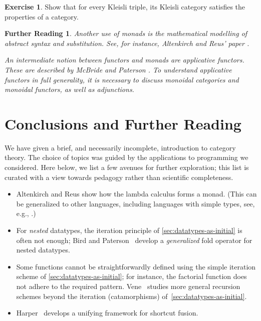 \documentclass[a4paper,11pt, oneside,titlepage=false]{scrbook}
\theoremstyle{plain}
\newtheorem*{reading*}{Further Reading}
\theoremstyle{definition}
\newtheorem{exer}[thm]{Exercise}
\begin{document}
\begin{exer} Show that for every Kleisli triple, its Kleisli category satisfies the properties of a category.
\end{exer}

\begin{reading*}
  Another use of monads is the mathematical modelling of abstract syntax and \emph{substitution}.
  See, for instance, Altenkirch and Reus' paper \cite{DBLP:conf/csl/AltenkirchR99}.

  An intermediate notion between functors and monads are \emph{applicative functors}. These are described by McBride and Paterson \cite{DBLP:journals/jfp/McbrideP08}.
  To understand applicative functors in full generality, it is necessary to discuss monoidal categories and monoidal functors, as well as adjunctions.
\end{reading*}

\chapter{Conclusions and Further Reading}

We have given a brief, and necessarily incomplete, introduction to category theory.
The choice of topics was guided by the applications to programming we considered.
 Here below, we list a few avenues for further exploration; this list is curated with a view towards pedagogy rather than scientific completeness.
\begin{itemize}
\item Altenkirch and Reus show how the lambda calculus forms a monad.
  (This can be generalized to other languages, including languages with simple types, see, e.g., \cite{DBLP:journals/jfrea/AhrensZ11}.)
\item For \emph{nested} datatypes, the iteration principle of \cref{sec:datatypes-as-initial} is often not enough; Bird and Paterson~\cite{DBLP:journals/fac/BirdP99} develop a \emph{generalized} fold operator for nested datatypes.
\item Some functions cannot be straightforwardly defined using the simple iteration scheme of \cref{sec:datatypes-as-initial}; for instance, the factorial function does not adhere to the required pattern.
  Vene~\cite{vene_phd} studies more general recursion schemes beyond the iteration (catamorphisms) of~\cref{sec:datatypes-as-initial}.
\item Harper~\cite{DBLP:phd/ethos/Harper13} develops a unifying framework for shortcut fusion.

\end{itemize}
\end{document}
